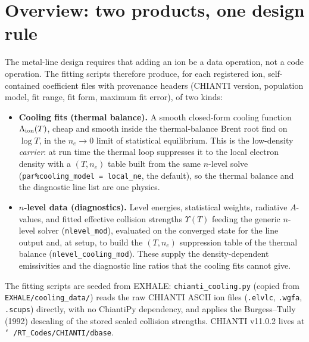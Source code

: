 \documentclass[english,a4paper]{my_memo}
\newcommand{\Lam}{\Lambda}
\newcommand{\code}[1]{\texttt{#1}}
\begin{document}
\section{Overview: two products, one design rule}
The metal-line design requires that adding an ion be a data operation,
not a code operation.  The fitting scripts therefore produce, for each
registered ion, self-contained coefficient files with provenance headers
(CHIANTI version, population model, fit range, fit form, maximum fit
error), of two kinds:

\begin{itemize}
\item \textbf{Cooling fits (thermal balance).}  A smooth closed-form
  cooling function $\Lam_{\rm ion}(T)$, cheap and smooth inside
  the thermal-balance Brent root find on $\log T$, in the $n_e \to 0$ limit of statistical
  equilibrium.  This is the low-density \emph{carrier}: at run time the
  thermal loop suppresses it to the local electron density with a
  $(T, n_e)$ table built from the same $n$-level solve
  (\code{par\%cooling\_model = local\_ne}, the default), so the thermal
  balance and the diagnostic line list are one physics.
\item \textbf{$n$-level data (diagnostics).}  Level energies,
  statistical weights, radiative $A$-values, and fitted effective
  collision strengths $\Upsilon(T)$ feeding the generic $n$-level solver
  (\code{nlevel\_mod}), evaluated on the converged state for the line
  output and, at setup, to build the $(T, n_e)$ suppression table of the
  thermal balance (\code{nlevel\_cooling\_mod}).  These supply the
  density-dependent emissivities and the diagnostic line ratios that the
  cooling fits cannot give.
\end{itemize}

The fitting scripts are seeded from EXHALE: \code{chianti\_cooling.py} (copied
from \code{EXHALE/cooling\_data/}) reads the raw CHIANTI ASCII ion files
(\code{.elvlc}, \code{.wgfa}, \code{.scups}) directly, with no ChiantiPy
dependency, and applies the Burgess--Tully (1992) descaling of the stored
scaled collision strengths.  CHIANTI v11.0.2 lives at
\code{\char`~/RT\_Codes/CHIANTI/dbase}.
\end{document}
